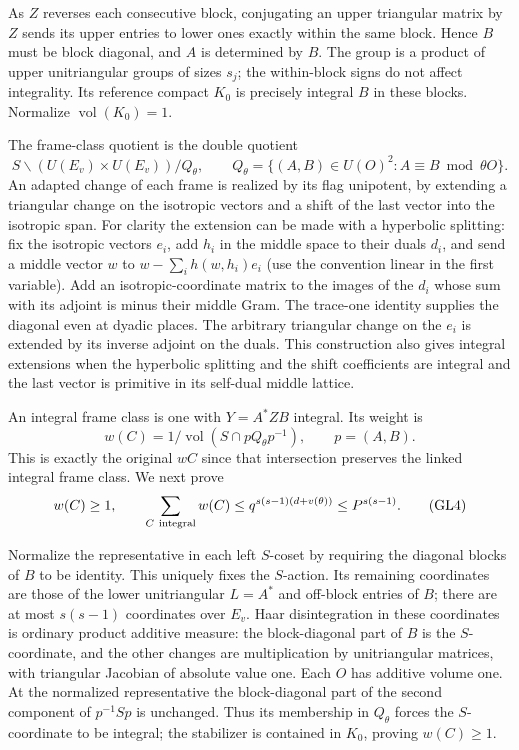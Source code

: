 As \(Z\) reverses each consecutive block, conjugating an upper
triangular matrix by \(Z\) sends its upper entries to lower ones
exactly within the same block. Hence \(B\) must be block diagonal,
and \(A\) is determined by \(B\). The group is a product of
upper unitriangular groups of sizes \(s_j\); the within-block
signs do not affect integrality. Its reference compact
\(K_0\) is precisely integral \(B\) in these blocks.
Normalize \(\operatorname{vol}(K_0)=1\).

The frame-class quotient is the double quotient
\[
 S\backslash (U(E_v)\times U(E_v))/Q_\theta,\qquad
 Q_\theta=\{(A,B)\in U(O)^2:A\equiv B\bmod\theta O\}.
\]
An adapted change of each frame is realized by its flag
unipotent, by extending a triangular change on the isotropic
vectors and a shift of the last vector into the isotropic
span. For clarity the extension can be made with a hyperbolic
splitting: fix the isotropic vectors \(e_i\), add \(h_i\) in the
middle space to their duals \(d_i\), and send a middle vector
\(w\) to \(w-\sum_i h(w,h_i)e_i\) (use the convention linear
in the first variable). Add an isotropic-coordinate matrix to
the images of the \(d_i\) whose sum with its adjoint is minus
their middle Gram. The trace-one identity supplies the diagonal
even at dyadic places. The arbitrary triangular change on
the \(e_i\) is extended by its inverse adjoint on the duals.
This construction also gives integral extensions when the
hyperbolic splitting and the shift coefficients are integral
and the last vector is primitive in its self-dual middle lattice.

An integral frame class is one with \(Y=A^*ZB\) integral.
Its weight is
\[
 w(C)=1/\operatorname{vol}(S\cap pQ_\theta p^{-1}),\qquad
 p=(A,B).
\]
This is exactly the original \(wC\) since that intersection
preserves the linked integral frame class. We next prove
\[
 w(C)\ge1,\qquad
 \sum_{C\ {\rm integral}}w(C)\le
       q^{s(s-1)(d+v(\theta))}\le P^{s(s-1)}.
 \tag{GL4}
\]

Normalize the representative in each left \(S\)-coset by
requiring the diagonal blocks of \(B\) to be identity.
This uniquely fixes the \(S\)-action. Its remaining coordinates
are those of the lower unitriangular \(L=A^*\) and off-block
entries of \(B\); there are at most \(s(s-1)\) coordinates
over \(E_v\). Haar disintegration in these coordinates
is ordinary product additive measure: the block-diagonal
part of \(B\) is the \(S\)-coordinate, and the other changes
are multiplication by unitriangular matrices, with triangular
Jacobian of absolute value one. Each \(O\) has additive
volume one. At the normalized representative the block-diagonal
part of the second component of \(p^{-1}Sp\) is unchanged.
Thus its membership in \(Q_\theta\) forces the
\(S\)-coordinate to be integral; the stabilizer is contained
in \(K_0\), proving \(w(C)\ge1\).

